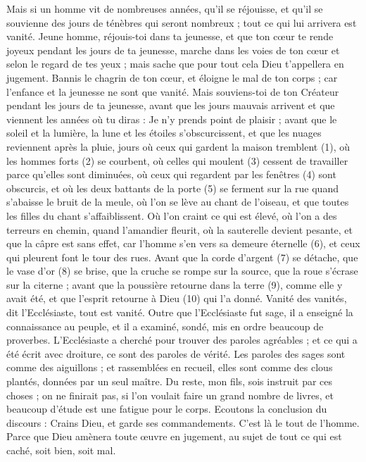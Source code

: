 \begin{multicols}{2}
Mais si un homme vit de nombreuses années, qu'il se réjouisse, et qu'il se souvienne des jours de ténèbres qui seront nombreux ; tout ce qui lui arrivera est vanité.
\VerseOne{}Jeune homme, réjouis-toi dans ta jeunesse, et que ton cœur te rende joyeux pendant les jours de ta jeunesse, marche dans les voies de ton cœur et selon le regard de tes yeux ; mais sache que pour tout cela Dieu t’appellera en jugement.
Bannis le chagrin de ton cœur, et éloigne le mal de ton corps ; car l’enfance et la jeunesse ne sont que vanité.
Mais souviens-toi de ton Créateur pendant les jours de ta jeunesse, avant que les jours mauvais arrivent et que viennent les années où tu diras : Je n'y prends point de plaisir ;
avant que le soleil et la lumière, la lune et les étoiles s'obscurcissent, et que les nuages reviennent après la pluie,
jours où ceux qui gardent la maison tremblent\FTNT{} (1), où les hommes forts\FTNT{} (2) se courbent, où celles qui moulent\FTNT{} (3) cessent de travailler parce qu'elles sont diminuées, où ceux qui regardent par les fenêtres\FTNT{} (4) sont obscurcis,
et où les deux battants de la porte\FTNT{} (5) se ferment sur la rue quand s’abaisse le bruit de la meule, où l’on se lève au chant de l'oiseau, et que toutes les filles du chant s’affaiblissent.
Où l’on craint ce qui est élevé, où l’on a des terreurs en chemin, quand l'amandier fleurit, où la sauterelle devient pesante, et que la câpre est sans effet, car l'homme s'en vers sa demeure éternelle\FTNT{} (6), et ceux qui pleurent font le tour des rues.
Avant que la corde d'argent\FTNT{} (7) se détache, que le vase d'or\FTNT{} (8) se brise, que la cruche se rompe sur la source, que la roue s’écrase sur la citerne ;
avant que la poussière retourne dans la terre\FTNT{} (9), comme elle y avait été, et que l'esprit retourne à Dieu\FTNT{} (10) qui l'a donné.
Vanité des vanités, dit l'Ecclésiaste, tout est vanité.
Outre que l'Ecclésiaste fut sage, il a enseigné la connaissance au peuple, et il a examiné, sondé, mis en ordre beaucoup de proverbes.
L'Ecclésiaste a cherché pour trouver des paroles agréables ; et ce qui a été écrit avec droiture, ce sont des paroles de vérité.
Les paroles des sages sont comme des aiguillons ; et rassemblées en recueil, elles sont comme des clous plantés, données par un seul maître.
Du reste, mon fils, sois instruit par ces choses ; on ne finirait pas, si l’on voulait faire un grand nombre de livres, et beaucoup d'étude est une fatigue pour le corps.
Ecoutons la conclusion du discours : Crains Dieu, et garde ses commandements. C'est là le tout de l'homme.
Parce que Dieu amènera toute œuvre en jugement, au sujet de tout ce qui est caché, soit bien, soit mal.
\PPE{}
\end{multicols}
